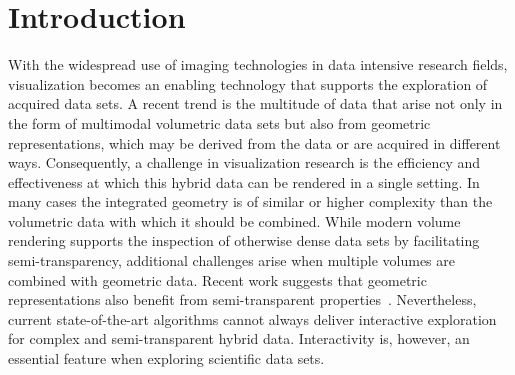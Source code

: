 \documentclass{egpubl}
\newcommand{\green}[1]{{\color{PineGreen}#1}}
\newcommand{\new}[1]{\green{#1}}
\newcommand{\todo}[1]{{\color{red}\emph{(#1)}}}
\newcommand{\remark}[1]{{\color{blue!80!white}\textbf{Remark:} #1}}
\newcommand{\ab}{\mbox{A-buffer}}
\begin{document}
\section{Introduction}
\label{sec:introduction}


With the widespread use of imaging technologies in data intensive research fields, visualization becomes an enabling technology that supports the exploration of acquired data sets. 
A recent trend is the multitude of data that arise not only in the form of multimodal volumetric data sets but also from geometric representations, which may be derived from the data or are acquired in different ways.
Consequently, a challenge in visualization research is the efficiency and effectiveness at which this hybrid data can be rendered in a single setting. 
In many cases the integrated geometry is of similar or higher complexity than the volumetric data with which it should be combined. 
While modern volume rendering supports the inspection of otherwise dense data sets by facilitating semi-transparency, additional challenges arise when multiple volumes are combined with geometric data. 
Recent work suggests that geometric representations also benefit from semi-transparent properties~\cite{Guenther:2013:TOG}. 
\new{
Nevertheless, current state-of-the-art algorithms cannot always deliver interactive exploration for complex and semi-transparent hybrid data. 
} 
Interactivity is, however, an essential feature when exploring scientific data sets.
\end{document}
